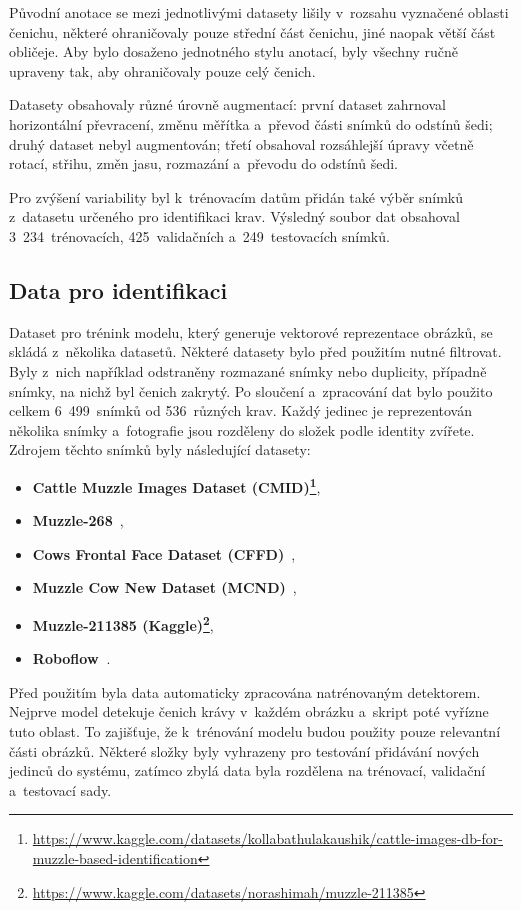 Původní anotace se mezi jednotlivými datasety lišily v~rozsahu vyznačené oblasti čenichu, některé ohraničovaly pouze střední část čenichu, jiné naopak větší část obličeje. Aby bylo dosaženo jednotného stylu anotací, byly všechny ručně upraveny tak, aby ohraničovaly pouze celý čenich.

Datasety obsahovaly různé úrovně augmentací: první dataset zahrnoval horizontální převracení, změnu měřítka a~převod části snímků do odstínů šedi; druhý dataset nebyl augmentován; třetí obsahoval rozsáhlejší úpravy včetně rotací, střihu, změn jasu, rozmazání a~převodu do odstínů šedi.

Pro zvýšení variability byl k~trénovacím datům přidán také výběr snímků z~datasetu určeného pro identifikaci krav. Výsledný soubor dat obsahoval 3~234~trénovacích, 425~validačních a~249~testovacích snímků.

\subsection*{Data pro identifikaci}
Dataset pro trénink modelu, který generuje vektorové reprezentace obrázků, se skládá z~několika datasetů. Některé datasety bylo před použitím nutné filtrovat. Byly z~nich například odstraněny rozmazané snímky nebo duplicity, případně snímky, na nichž byl čenich zakrytý. Po sloučení a~zpracování dat bylo použito celkem 6~499~snímků od 536~různých krav. Každý jedinec je reprezentován několika snímky a~fotografie jsou rozděleny do složek podle identity zvířete. Zdrojem těchto snímků byly následující datasety:

\begin{itemize}
	\item \textbf{Cattle Muzzle Images Dataset (CMID)\footnote{\url{https://www.kaggle.com/datasets/kollabathulakaushik/cattle-images-db-for-muzzle-based-identification}}},
	\item \textbf{Muzzle-268}~\cite{muzzle_detail_dataset_2021},
	\item \textbf{Cows Frontal Face Dataset (CFFD)}~\cite{syed_umaid_ahmed_2024_10535934},
	\item \textbf{Muzzle Cow New Dataset (MCND)}~\cite{sipa},
	\item \textbf{Muzzle-211385 (Kaggle)\footnote{\url{https://www.kaggle.com/datasets/norashimah/muzzle-211385}}},
	\item \textbf{Roboflow~\cite{cattle-identification_dataset}}.
\end{itemize}

Před použitím byla data automaticky zpracována natrénovaným detektorem. Nejprve model detekuje čenich krávy v~každém obrázku a~skript poté vyřízne tuto oblast. To zajišťuje, že k~trénování modelu budou použity pouze relevantní části obrázků. Některé složky byly vyhrazeny pro testování přidávání nových jedinců do systému, zatímco zbylá data byla rozdělena na trénovací, validační a~testovací sady.

